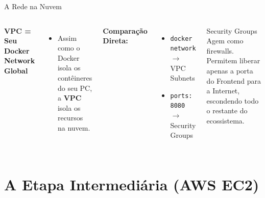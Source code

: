 \documentclass[aspectratio=169,t,xcolor=table]{beamer}
\begin{document}
\begin{frame}{A Rede na Nuvem}

    \begin{columns}
        \textbf{VPC = Seu Docker Network Global}
        \begin{itemize}
            \item Assim como o Docker isola os contêineres do seu PC, a \textbf{VPC} isola os recursos na nuvem.
        \end{itemize}
        
        \vspace{0.5em}
        \textbf{Comparação Direta:}
        \begin{itemize}
            \item \texttt{docker network} $\rightarrow$ VPC Subnets
            \item \texttt{ports: 8080} $\rightarrow$ Security Groups
        \end{itemize}

        \begin{block}{Security Groups}
            Agem como firewalls. Permitem liberar apenas a porta do Frontend para a Internet, escondendo todo o restante do ecossistema.
        \end{block}
    \end{columns}

\end{frame}

\section[UFGBlue]{A Etapa Intermediária (AWS EC2)}
\end{document}
